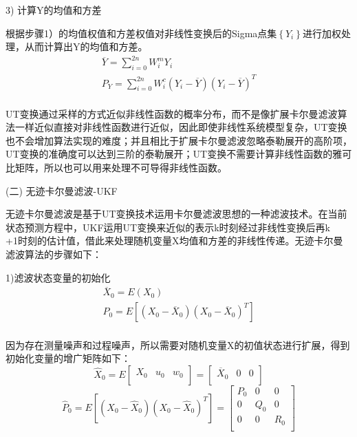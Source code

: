 3) 计算Y的均值和方差

根据步骤1）的均值权值和方差权值对非线性变换后的Sigma点集$\left\{ {{Y}_{i}} \right\}$进行加权处理，从而计算出Y的均值和方差。
\begin{equation}\label{3-28}
\begin{array}{l}
   \overline{Y}=\sum\limits_{i=0}^{2n}{W_{i}^{m}{{Y}_{i}}} \\ 
  {{P}_{Y}}=\sum\limits_{i=0}^{2n}{W_{i}^{c}({{Y}_{i}}-\overline{Y}){{({{Y}_{i}}-\overline{Y})}^{T}}} \\ 
\end{array}
\end{equation}

UT变换通过采样的方式近似非线性函数的概率分布，而不是像扩展卡尔曼滤波算法一样近似直接对非线性函数进行近似，因此即使非线性系统模型复杂，UT变换也不会增加算法实现的难度；并且相比于扩展卡尔曼滤波忽略泰勒展开的高阶项，UT变换的准确度可以达到三阶的泰勒展开；UT变换不需要计算非线性函数的雅可比矩阵，所以也可以用来处理不可导得非线性函数。

(二)	无迹卡尔曼滤波-UKF

	无迹卡尔曼滤波是基于UT变换技术运用卡尔曼滤波思想的一种滤波技术。在当前状态预测方程中，UKF运用UT变换来近似的表示k时刻经过非线性变换后再k\\+1时刻的估计值，借此来处理随机变量X均值和方差的非线性传递。无迹卡尔曼滤波算法的步骤如下：

1)滤波状态变量的初始化
\begin{equation}
\begin{array}{l}
   {{\overline{X}}_{0}}=E\left( {{X}_{0}} \right) \\ 
  {{P}_{0}}=E\left[ \left( {{X}_{0}}-{{\overline{X}}_{0}} \right){{\left( {{X}_{0}}-{{\overline{X}}_{0}} \right)}^{T}} \right] \\ 
\end{array}
\end{equation}

因为存在测量噪声和过程噪声，所以需要对随机变量X的初值状态进行扩展，得到初始化变量的增广矩阵如下：
\begin{equation}
{{\widehat{X}}_{0}}=E\left[ \begin{matrix}
   {{X}_{0}} & {{u}_{0}} & {{w}_{0}}  \\
\end{matrix} \right]=\left[ \begin{matrix}
   {{\overline{X}}_{0}} & 0 & 0  \\
\end{matrix} \right]
\end{equation}
\begin{equation}
{{\widehat{P}}_{0}}=E\left[ \left( {{X}_{0}}-{{\widehat{X}}_{0}} \right){{\left( {{X}_{0}}-{{\widehat{X}}_{0}} \right)}^{T}} \right]=\left[ \begin{matrix}
   {{P}_{0}} & 0 & 0  \\
   0 & {{Q}_{0}} & 0  \\
   0 & 0 & {{R}_{0}}  \\
\end{matrix} \right]
\end{equation}

